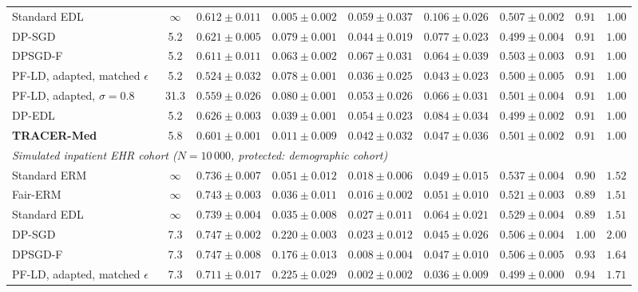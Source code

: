 \documentclass[pdflatex,sn-vancouver-num,referee,lineno]{sn-jnl}
\theoremstyle{thmstyleone}
\theoremstyle{thmstylethree}
\begin{document}
\begin{table}
\begin{tabular}{lcccccccc}
Standard EDL & $\infty$ & $0.612 \pm 0.011$ & $0.005 \pm 0.002$ & $0.059 \pm 0.037$ & $0.106 \pm 0.026$ & $0.507 \pm 0.002$ & $0.91$ & $1.00$ \\
DP-SGD & 5.2 & $0.621 \pm 0.005$ & $0.079 \pm 0.001$ & $0.044 \pm 0.019$ & $0.077 \pm 0.023$ & $0.499 \pm 0.004$ & $0.91$ & $1.00$ \\
DPSGD-F~\cite{xu2021removing} & 5.2 & $0.611 \pm 0.011$ & $0.063 \pm 0.002$ & $0.067 \pm 0.031$ & $0.064 \pm 0.039$ & $0.503 \pm 0.003$ & $0.91$ & $1.00$ \\
PF-LD, adapted, matched $\epsilon$~\cite{tran2021differentially} & 5.2 & $0.524 \pm 0.032$ & $0.078 \pm 0.001$ & $\mathbf{0.036} \pm \mathbf{0.025}$ & $\mathbf{0.043} \pm \mathbf{0.023}$ & $0.500 \pm 0.005$ & $0.91$ & $1.00$ \\
PF-LD, adapted, $\sigma=0.8$~\cite{tran2021differentially} & 31.3 & $0.559 \pm 0.026$ & $0.080 \pm 0.001$ & $0.053 \pm 0.026$ & $0.066 \pm 0.031$ & $0.501 \pm 0.004$ & $0.91$ & $1.00$ \\
DP-EDL & 5.2 & $\mathbf{0.626} \pm \mathbf{0.003}$ & $0.039 \pm 0.001$ & $0.054 \pm 0.023$ & $0.084 \pm 0.034$ & $\mathbf{0.499} \pm \mathbf{0.002}$ & $0.91$ & $1.00$ \\
\textbf{TRACER-Med} & 5.8 & $0.601 \pm 0.001$ & $\mathbf{0.011} \pm \mathbf{0.009}$ & $0.042 \pm 0.032$ & $0.047 \pm 0.036$ & $0.501 \pm 0.002$ & $0.91$ & $1.00$ \\
\midrule
\multicolumn{9}{l}{\emph{Simulated inpatient EHR cohort ($N=10\,000$, protected: demographic cohort)}} \\
Standard ERM & $\infty$ & $0.736 \pm 0.007$ & $0.051 \pm 0.012$ & $0.018 \pm 0.006$ & $0.049 \pm 0.015$ & $0.537 \pm 0.004$ & $0.90$ & $1.52$ \\
Fair-ERM & $\infty$ & $0.743 \pm 0.003$ & $0.036 \pm 0.011$ & $0.016 \pm 0.002$ & $0.051 \pm 0.010$ & $0.521 \pm 0.003$ & $0.89$ & $1.51$ \\
Standard EDL & $\infty$ & $0.739 \pm 0.004$ & $0.035 \pm 0.008$ & $0.027 \pm 0.011$ & $0.064 \pm 0.021$ & $0.529 \pm 0.004$ & $0.89$ & $1.51$ \\
DP-SGD & 7.3 & $0.747 \pm 0.002$ & $0.220 \pm 0.003$ & $0.023 \pm 0.012$ & $0.045 \pm 0.026$ & $0.506 \pm 0.004$ & $1.00$ & $2.00$ \\
DPSGD-F~\cite{xu2021removing} & 7.3 & $0.747 \pm 0.008$ & $0.176 \pm 0.013$ & $0.008 \pm 0.004$ & $0.047 \pm 0.010$ & $0.506 \pm 0.005$ & $0.93$ & $1.64$ \\
PF-LD, adapted, matched $\epsilon$~\cite{tran2021differentially} & 7.3 & $0.711 \pm 0.017$ & $0.225 \pm 0.029$ & $\mathbf{0.002} \pm \mathbf{0.002}$ & $\mathbf{0.036} \pm \mathbf{0.009}$ & $\mathbf{0.499} \pm \mathbf{0.000}$ & $0.94$ & $1.71$ \\

\end{tabular}
\end{table}
\end{document}
